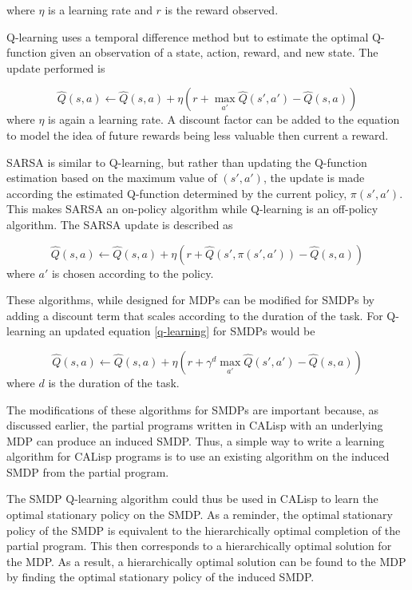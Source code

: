 \documentclass[jair,twoside,11pt,theapa]{article}
\begin{document}
where $\eta$ is a learning rate and $r$ is the reward observed. 

Q-learning uses a temporal difference method but to estimate the optimal Q-function given an observation of a state, action, reward, and new state. The update performed is 

\begin{equation}
\label{q-learning}
\hat{Q}(s,a) \leftarrow \hat{Q}(s,a) + \eta(r + \max_{a'}\hat{Q}(s',a') - \hat{Q}(s,a))
\end{equation}
where $\eta$ is again a learning rate. A discount factor can be added to the equation to model the idea of future rewards being less valuable then current a reward. 

SARSA is similar to Q-learning, but rather than updating the Q-function estimation based on the maximum value of $(s', a')$, the update is made according the estimated Q-function determined by the current policy, $\pi(s',a')$. This makes SARSA an on-policy algorithm while Q-learning is an off-policy algorithm. The SARSA update is described as 

\begin{equation}
\label{SARSA}
\hat{Q}(s,a) \leftarrow \hat{Q}(s,a) + \eta(r + \hat{Q}(s', \pi(s',a')) - \hat{Q}(s,a))
\end{equation}
where $a'$ is chosen according to the policy. 

These algorithms, while designed for MDPs can be modified for SMDPs by adding a discount term that scales according to the duration of the task. For Q-learning an updated equation \ref{q-learning} for SMDPs would be 

\begin{equation}
\label{q-SMDP}
\hat{Q}(s,a) \leftarrow \hat{Q}(s,a) + \eta(r + \gamma^d \max_{a'}\hat{Q}(s',a') - \hat{Q}(s,a))
\end{equation}
where $d$ is the duration of the task. 

The modifications of these algorithms for SMDPs are important because, as discussed earlier, the partial programs written in CALisp with an underlying MDP can produce an induced SMDP. Thus, a simple way to write a learning algorithm for CALisp programs is to use an existing algorithm on the induced SMDP from the partial program. 

The SMDP Q-learning algorithm could thus be used in CALisp to learn the optimal stationary policy on the SMDP. As a reminder, the optimal stationary policy of the SMDP is equivalent to the hierarchically optimal completion of the partial program. This then corresponds to a hierarchically optimal solution for the MDP. As a result, a hierarchically optimal solution can be found to the MDP by finding the optimal stationary policy of the induced SMDP. 
\end{document}

